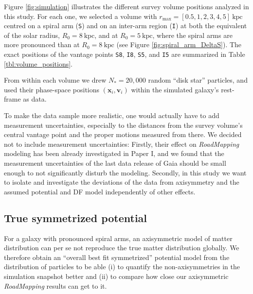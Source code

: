 \documentclass[iop,revtex4,numberedappendix,appendixfloats]{emulateapj}
\newcommand{\vect}[1]{\boldsymbol{#1}}
\newcommand{\RM}{{\sl RoadMapping}}
\begin{document}
Figure \ref{fig:simulation} illustrates the different survey volume positions analyzed in this study. For each one, we selected a volume with $r_\text{max}=[0.5,1,2,3,4,5]~\text{kpc}$ centred on a spiral arm (\texttt{S}) and on an inter-arm region (\texttt{I}) at both the equivalent of the solar radius, $R_0=8~\text{kpc}$, and at $R_0=5~\text{kpc}$, where the spiral arms are more pronounced than at $R_0=8~\text{kpc}$ (see Figure \ref{fig:spiral_arm_DeltaS}). The exact positions of the vantage points \texttt{S8}, \texttt{I8}, \texttt{S5}, and \texttt{I5} are summarized in Table \ref{tbl:volume_positions}.

From within each volume we drew $N_*=20,000$ random ``disk star'' particles, and used their phase-space positions $(\vect{x}_i,\vect{v}_i)$ within the simulated galaxy's rest-frame as data. 

To make the data sample more realistic, one would actually have to add measurement uncertainties, especially to the distances from the survey volume's central vantage point and the proper motions measured from there. We decided not to include measurement uncertainties: Firstly, their effect on \RM{} modeling has been already investigated in Paper I, and we found that the measurement uncertainties of the last data release of Gaia should be small enough to not significantly disturb the modeling. Secondly, in this study we want to isolate and investigate the deviations of the data from axisymmetry and the assumed potential and DF model independently of other effects.

\subsection{True symmetrized potential} \label{sec:DEHH-Pot}

For a galaxy with pronounced spiral arms, an axisymmetric model of matter distribution can per se not reproduce the true matter distribution globally. We therefore obtain an ``overall best fit symmetrized'' potential model from the distribution of particles to be able (i) to quantify the non-axisymmetries in the simulation snapshot better and (ii) to compare how close our axisymmetric \RM{} results can get to it. 
\end{document}
